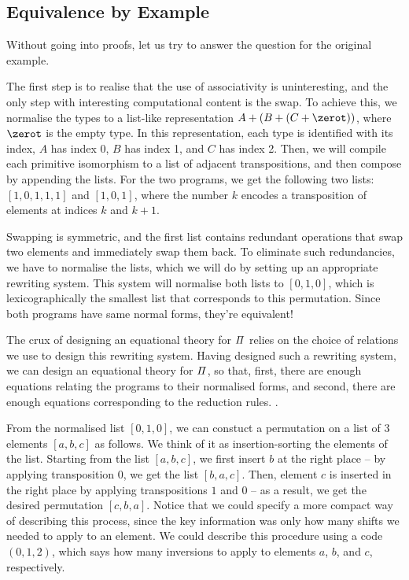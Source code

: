 \subsection*{Equivalence by Example}

Without going into proofs, let us try to answer the question for the original example.

The first step is to realise that the use of associativity is uninteresting, and the only step with interesting
computational content is the swap. To achieve this, we normalise the types to a list-like representation $A + (B + (C +
\zerot))$, where $\zerot$ is the empty type. In this representation, each type is identified with its index, $A$ has
index 0, $B$ has index 1, and $C$ has index 2. Then, we will compile each primitive isomorphism to a list of adjacent
transpositions, and then compose by appending the lists. For the two programs, we get the following two lists:
$[1,0,1,1,1]$ and $[1,0,1]$, where the number $k$ encodes a transposition of elements at indices $k$ and $k+1$. 

Swapping is symmetric, and the first list contains redundant operations that swap two elements and immediately swap them
back. To eliminate such redundancies, we have to normalise the lists, which we will do by setting up an appropriate
rewriting system. This system will normalise both lists to $[0,1,0]$, which is lexicographically the smallest list that
corresponds to this permutation. Since both programs have same normal forms, they're equivalent!

The crux of designing an equational theory for $\mathit{\Pi}$ relies on the choice of relations we use to design this
rewriting system. Having designed such a rewriting system, we can design an equational theory for $\mathit{\Pi}$, so that,
first, there are enough equations relating the programs to their normalised forms, and second, there are enough
equations corresponding to the reduction rules. .

From the normalised list $[0,1,0]$, we can constuct a permutation on a list of 3 elements $[a,b,c]$ as follows. We think
of it as insertion-sorting the elements of the list. Starting from the list $[a, b, c]$, we first insert $b$ at the
right place -- by applying transposition $0$, we get the list $[b, a, c]$. Then, element $c$ is inserted in the right
place by applying transpositions $1$ and $0$ -- as a result, we get the desired permutation $[c, b, a]$. Notice that we
could specify a more compact way of describing this process, since the key information was only how many shifts we
needed to apply to an element. We could describe this procedure using a code $(0, 1, 2)$, which says how many inversions
to apply to elements $a$, $b$, and $c$, respectively.


